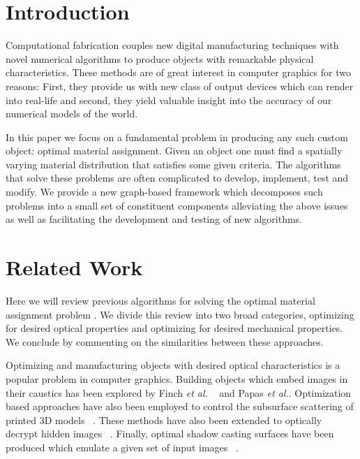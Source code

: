 \documentclass[annual]{acmsiggraph}
\newcommand{\note}[1]{\marginpar{\LARGE $\spadesuit$}
			$\spadesuit$ {\bf #1} $\spadesuit$}
\begin{document}
\keywordlist

\TOGlinkslist

\copyrightspace



\section{Introduction}
Computational fabrication couples new digital manufacturing techniques with novel numerical algorithms to produce objects with remarkable physical characteristics. These methods are of great interest in computer graphics for two reasons: First, they provide us with  new class of output devices which can render into  real-life and second, they yield valuable insight into the accuracy of our numerical models of the world.  

In this paper we focus on a fundamental problem in producing any such custom object:  optimal material assignment. Given an object one must find a spatially varying material distribution that satisfies some given criteria. The algorithms that solve these problems are often complicated to develop, implement, test and modify. We provide a new graph-based framework which decomposes such problems into a small set of constituent components alleviating the above issues as well as facilitating the development and testing of new algorithms. 

\section{Related Work} 
Here we will review previous algorithms for solving the optimal material assignment problem . We divide this review into two broad categories, optimizing for desired optical properties and optimizing for desired mechanical properties. We conclude by commenting on the similarities between these approaches.

Optimizing and manufacturing objects with desired optical characteristics is a popular problem in computer graphics. Building objects which embed images in their caustics has been explored by Finch \textit{et al.} ~ and Papas \textit{et al.}. Optimization based approaches have also been employed to control the subsurface scattering of printed 3D models ~\cite{Hasan:2010}. These methods have also been extended to optically decrypt hidden images ~\cite{Papas:2012}. Finally, optimal shadow casting surfaces have been produced which emulate a given set of input images ~\cite{Bermano:2012}.
\end{document}

